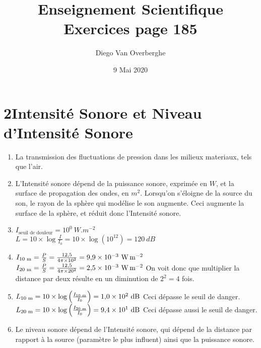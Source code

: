 \documentclass[12pt, a4paper]{article}
\newcommand{\logb}[1]{
    \log\left(#1\right)
}
\begin{document}
    \title{Enseignement Scientifique \\ Exercices page 185}
    \author{Diego Van Overberghe}
    \date{9 Mai 2020}
    \maketitle
    
    \section*{2\quad Intensité Sonore et Niveau d'Intensité Sonore}
    \begin{enumerate}[1.]
        \item   La transmission des fluctuations de pression dans les milieux materiaux, tels que l'air.
        \item   L'Intensité sonore dépend de la puissance sonore, exprimée en $W$, et la surface de propagation des ondes, en $m^2$. Lorsqu'on s'éloigne de la source du son, le rayon de la sphère qui modélise le son augmente. Ceci augmente la surface de la sphère, et réduit donc l'Intensité sonore.
        \item   $I_\text{seuil de douleur}=10^0\ \si{W.m^{-2}}$ \\ $L=10\times\log{\frac{I}{I_0}}=10\times\logb{10^{12}}=120\ \si{dB}$
        \item   $I_\text{10\ \si{m}}=\frac{P}{S}=\frac{12{,}5}{4\pi\times 10^2}=9{,}9\times 10^{-3}\ \si{W.m^{-2}}$ \smallbreak $I_\text{20\ \si{m}}=\frac{P}{S}=\frac{12{,}5}{4\pi\times 20^2}=2{,}5\times 10^{-3}\ \si{W.m^{-2}}$ \smallbreak On voit donc que multiplier la distance par deux résulte en un diminution de $2^2=4$ fois.
        \item $L_\text{10\ \si{m}}=10\times\logb{\frac{I_\text{10\ \si{m}}}{I_0}}=1{,}0\times 10^2\ \si{dB}$ \quad Ceci dépasse le seuil de danger. \smallbreak $L_\text{20\ \si{m}}=10\times\logb{\frac{I_\text{20\ \si{m}}}{I_0}}=9{,}4\times 10^{1}\ \si{dB}$ \quad Ceci dépasse aussi le seuil de danger.
        \item Le niveau sonore dépend de l'Intensité sonore, qui dépend de la distance par rapport à la source (paramètre le plus influent) ainsi que la puissance sonore.
    \end{enumerate}
\end{document}

